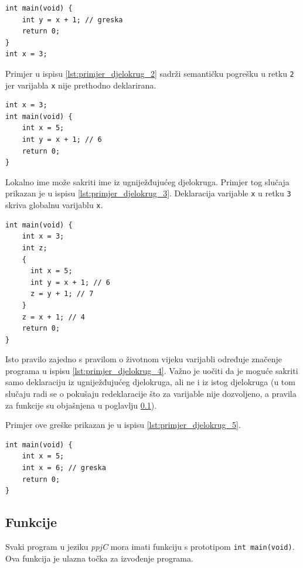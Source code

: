 \documentclass[times, 12pt, utf8]{book}
\begin{document}
\begin{lstlisting}[caption={Primjer pogreške u djelokrugu---varijabla \texttt{x} nije deklarirana prije korištenja.},label=lst:primjer_djelokrug_2]
int main(void) {
    int y = x + 1; // greska
    return 0;
}
int x = 3;
\end{lstlisting}

Primjer u ispisu \ref{lst:primjer_djelokrug_2} sadrži semantičku pogrešku u retku \verb|2| jer varijabla \verb|x| nije prethodno deklarirana.

\begin{lstlisting}[caption={Sakrivanje globalne deklaracije.},label=lst:primjer_djelokrug_3]
int x = 3;
int main(void) {
    int x = 5;
    int y = x + 1; // 6
    return 0;
}
\end{lstlisting}

Lokalno ime može sakriti ime iz ugniježđujućeg djelokruga.
Primjer tog slučaja prikazan je u ispisu \ref{lst:primjer_djelokrug_3}.
Deklaracija varijable \verb|x| u retku \verb|3| skriva globalnu varijablu \verb|x|.

\begin{lstlisting}[caption={Sakrivanje deklaracije u bloku.},label=lst:primjer_djelokrug_4]
int main(void) {
    int x = 3;
    int z;
    {
      int x = 5;
      int y = x + 1; // 6
      z = y + 1; // 7
    }
    z = x + 1; // 4
    return 0;
}
\end{lstlisting}

Isto pravilo zajedno s pravilom o životnom vijeku varijabli određuje značenje programa u ispisu \ref{lst:primjer_djelokrug_4}.
Važno je uočiti da je moguće sakriti samo deklaraciju iz ugniježđujućeg djelokruga, ali ne i iz istog djelokruga (u tom slučaju radi se o pokušaju redeklaracije što za varijable nije dozvoljeno, a pravila za funkcije su objašnjena u poglavlju \ref{sec:semantika_funkcije}).

Primjer ove greške prikazan je u ispisu \ref{lst:primjer_djelokrug_5}.

\begin{lstlisting}[caption={Nedozvoljena redeklaracija varijable.},label=lst:primjer_djelokrug_5]
int main(void) {
    int x = 5;
    int x = 6; // greska
    return 0;
}
\end{lstlisting}

\subsection{Funkcije}\label{sec:semantika_funkcije}
Svaki program u jeziku \emph{ppjC} mora imati funkciju s prototipom \verb|int main(void)|.
Ova funkcija je ulazna točka za izvođenje programa.
\end{document}
